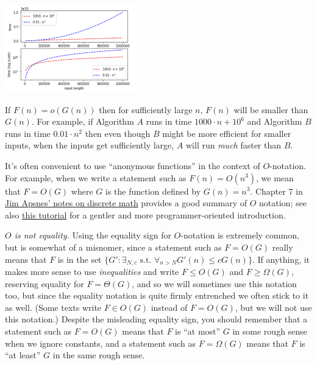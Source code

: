 \begin{marginfigure}
\centering
\includegraphics[width=\linewidth, height=1.5in, keepaspectratio]{../figure/nvsnsquared.png}
\caption{If \(F(n)=o(G(n))\) then for sufficiently large \(n\), \(F(n)\)
will be smaller than \(G(n)\). For example, if Algorithm \(A\) runs in
time \(1000\cdot n+10^6\) and Algorithm \(B\) runs in time
\(0.01\cdot n^2\) then even though \(B\) might be more efficient for
smaller inputs, when the inputs get sufficiently large, \(A\) will run
\emph{much} faster than \(B\).}
\label{nvsnsquaredfig}
\end{marginfigure}

It's often convenient to use ``anonymous functions'' in the context of
\(O\)-notation. For example, when we write a statement such as
\(F(n) = O(n^3)\), we mean that \(F=O(G)\) where \(G\) is the function
defined by \(G(n)=n^3\). Chapter 7 in
\href{http://www.cs.yale.edu/homes/aspnes/classes/202/notes.pdf}{Jim
Apsnes' notes on discrete math} provides a good summary of \(O\)
notation; see also \href{http://discrete.gr/complexity/}{this tutorial}
for a gentler and more programmer-oriented introduction.

\emph{\(O\) is not equality.} Using the equality sign for \(O\)-notation
is extremely common, but is somewhat of a misnomer, since a statement
such as \(F = O(G)\) really means that \(F\) is in the set
\(\{ G' : \exists_{N,c} \text{ s.t. } \forall_{n>N} G'(n) \leq c G(n) \}\).
If anything, it makes more sense to use \emph{inequalities} and write
\(F \leq O(G)\) and \(F \geq \Omega(G)\), reserving equality for
\(F = \Theta(G)\), and so we will sometimes use this notation too, but
since the equality notation is quite firmly entrenched we often stick to
it as well. (Some texts write \(F \in O(G)\) instead of \(F = O(G)\),
but we will not use this notation.) Despite the misleading equality
sign, you should remember that a statement such as \(F = O(G)\) means
that \(F\) is ``at most'' \(G\) in some rough sense when we ignore
constants, and a statement such as \(F = \Omega(G)\) means that \(F\) is
``at least'' \(G\) in the same rough sense.

